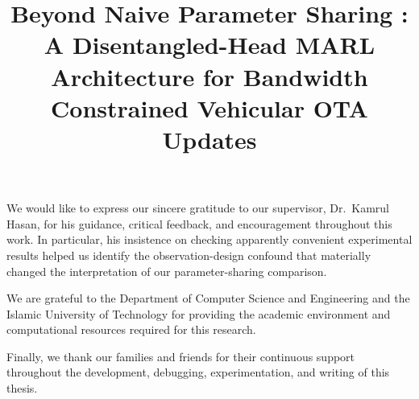 \documentclass{iutbscthesis}
\title{Beyond Naive Parameter Sharing : A Disentangled-Head MARL Architecture for Bandwidth Constrained Vehicular OTA Updates}
\begin{document}
\coverpage
{}
\titlepage
\declarationofcandidate
{}

\tableofcontents
\listoffigures
\listoftables
\clearpage

\begin{abbreviations}
\end{abbreviations}

\begin{acknowledgement}
We would like to express our sincere gratitude to our supervisor, Dr.\ Kamrul Hasan, for his guidance, critical feedback, and encouragement throughout this work. In particular, his insistence on checking apparently convenient experimental results helped us identify the observation-design confound that materially changed the interpretation of our parameter-sharing comparison.

We are grateful to the Department of Computer Science and Engineering and the Islamic University of Technology for providing the academic environment and computational resources required for this research.

Finally, we thank our families and friends for their continuous support throughout the development, debugging, experimentation, and writing of this thesis.
\end{acknowledgement}
\end{document}
